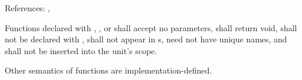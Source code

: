 References: , 

\specsubsubitem
Functions declared with , , or 
shall accept no parameters, shall return void, shall not be declared with
, shall not appear in s, need
not have unique names, and shall not be inserted into the unit's scope.

\specsubsubitem
Other semantics of  functions are implementation-defined.


\begin{grammar}
\\
	 \\

\\
	\\
	 \\

\\
	   \terminal{;}\\
	   \terminal{::} \terminal{\{}  \terminal{\}} \terminal{;}\\
	  \terminal{::} \terminal{*} \terminal{;}\\

\\
	 \terminal{=}\\

\\
	 \optional{\terminal{,}}\\
	 \terminal{,} \\

\\
	\\
	 \terminal{=} \\
\end{grammar}

